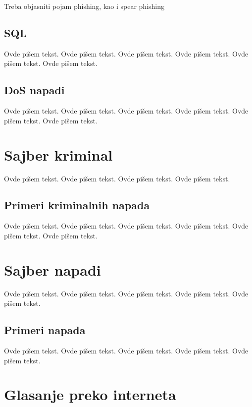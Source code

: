 \documentclass[a4paper]{article}
\begin{document}
{Treba objasniti pojam phishing, kao i spear phishing

\subsection{SQL}
\label{subsec:sql}

Ovde pišem tekst. 
Ovde pišem tekst. 
Ovde pišem tekst. 
Ovde pišem tekst. 
Ovde pišem tekst. 
Ovde pišem tekst.

\subsection{DoS napadi}
\label{subsec:DoS}

Ovde pišem tekst. 
Ovde pišem tekst. 
Ovde pišem tekst. 
Ovde pišem tekst. 
Ovde pišem tekst. 
Ovde pišem tekst. 

\section{Sajber kriminal}
\label{sec:sajber_kriminal}

Ovde pišem tekst. 
Ovde pišem tekst. 
Ovde pišem tekst. 
Ovde pišem tekst. 

\subsection{Primeri kriminalnih napada}
\label{subsec:primeri_krimi_napada}

Ovde pišem tekst. 
Ovde pišem tekst. 
Ovde pišem tekst. 
Ovde pišem tekst. 
Ovde pišem tekst. 
Ovde pišem tekst. 

\section{Sajber napadi}
\label{sec:sajber_napadi}

Ovde pišem tekst. 
Ovde pišem tekst. 
Ovde pišem tekst. 
Ovde pišem tekst. 
Ovde pišem tekst. 

\subsection{Primeri napada}
\label{subsec:primeri_napada}

Ovde pišem tekst. 
Ovde pišem tekst. 
Ovde pišem tekst. 
Ovde pišem tekst. 
Ovde pišem tekst. 


\section{Glasanje preko interneta}
\label{sec:glasanje}

}
\end{document}

